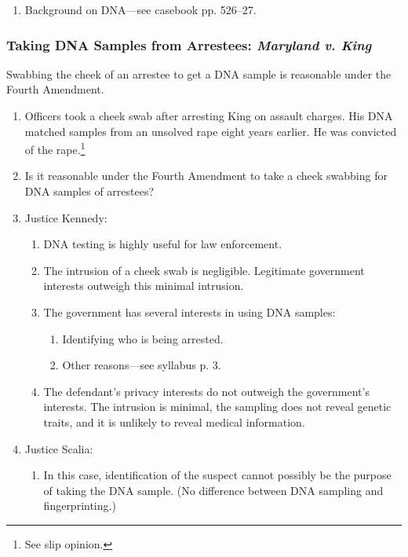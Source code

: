 \begin{enumerate}
    \item Background on DNA---see casebook pp. 526--27.
\end{enumerate}





\subsubsection{Taking DNA Samples from Arrestees: \emph{Maryland v. King}}

Swabbing the cheek of an arrestee to get a DNA sample is reasonable under the 
Fourth Amendment.

\begin{enumerate}
    \item Officers took a cheek swab after arresting King on assault charges. 
    His DNA matched samples from an unsolved rape eight years earlier. He was 
    convicted of the rape.\footnote{See slip opinion.}
    \item Is it reasonable under the Fourth Amendment to take a cheek swabbing 
    for DNA samples of arrestees?
    \item Justice Kennedy:
    \begin{enumerate}
        \item DNA testing is highly useful for law enforcement.
        \item The intrusion of a cheek swab is negligible. Legitimate government 
        interests outweigh this minimal intrusion.
        \item The government has several interests in using DNA samples:
        \begin{enumerate}
            \item Identifying who is being arrested.
            \item Other reasons---see syllabus p. 3.
        \end{enumerate}
        \item The defendant's privacy interests do not outweigh the government's 
        interests. The intrusion is minimal, the sampling does not reveal 
        genetic traits, and it is unlikely to reveal medical information.
    \end{enumerate}
    \item Justice Scalia:
    \begin{enumerate}
        \item In this case, identification of the suspect cannot possibly be the 
        purpose of taking the DNA sample. (No difference between DNA sampling 
        and fingerprinting.)
    \end{enumerate}
\end{enumerate}
